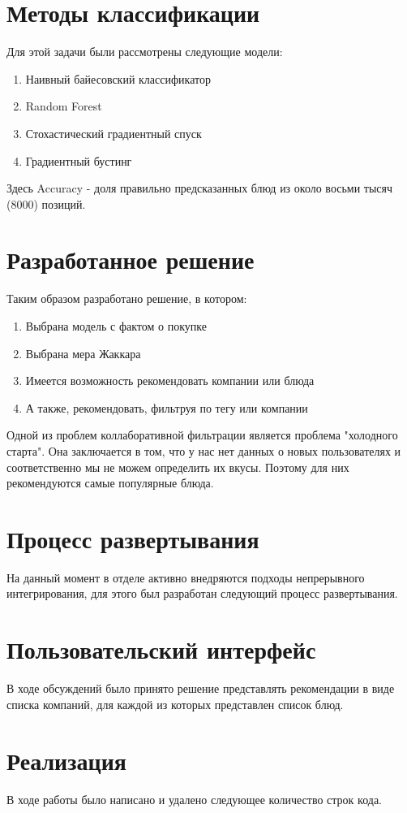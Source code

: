 \documentclass{fefu}
\begin{document}
  \section{Методы классификации}
  Для этой задачи были рассмотрены следующие модели:
  \begin{enumerate}
    \item Наивный байесовский классификатор
    \item Random Forest
    \item Стохастический градиентный спуск
    \item Градиентный бустинг
  \end{enumerate}
  Здесь Accuracy - доля правильно предсказанных блюд из около восьми тысяч (8000)
  позиций.

  \section{Разработанное решение}
  Таким образом разработано решение, в котором:
  \begin{enumerate}
    \item Выбрана модель с фактом о покупке
    \item Выбрана мера Жаккара
    \item Имеется возможность рекомендовать компании или блюда
    \item А также, рекомендовать, фильтруя по тегу или компании
  \end{enumerate}
  Одной из проблем коллаборативной фильтрации является проблема "холодного старта".
  Она заключается в том, что у нас нет данных о новых пользователях и соответственно
  мы не можем определить их вкусы. Поэтому для них рекомендуются самые популярные блюда.

  \section{Процесс развертывания}
  На данный момент в отделе активно внедряются подходы непрерывного интегрирования,
  для этого был разработан следующий процесс развертывания.

  \section{Пользовательский интерфейс}
  В ходе обсуждений было принято решение представлять рекомендации в виде списка
  компаний, для каждой из которых представлен список блюд.

  \section{Реализация}
  В ходе работы было написано и удалено следующее количество строк кода.
\end{document}
